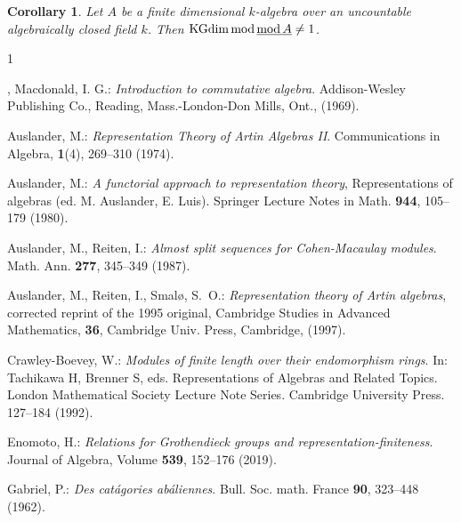 \documentclass[11pt]{amsart}
\newtheorem{corollary}[theorem]{Corollary}
\theoremstyle{definition}
\numberwithin{equation}{section}
\begin{document}
\begin{corollary}\label{C11}
Let $A$ be a finite dimensional $k$-algebra over an uncountable algebraically closed field $k$. 
Then $\mathrm{KGdim}\, \mathrm{mod}\, \underline{\mathrm{mod}\, A} \neq 1$. 
\end{corollary}



\ifx\undefined\bysame 
\newcommand{\bysame}{\leavevmode\hbox to3em{\hrulefill}\,} 
\fi 
\begin{thebibliography}{1} 

, {\sc Macdonald, I. G.}: 
{\it Introduction to commutative algebra}. 
Addison-Wesley Publishing Co., Reading, Mass.-London-Don Mills, Ont., (1969). 

{\sc Auslander, M.}: 
{\it Representation Theory of Artin Algebras II}. 
Communications in Algebra, {\bf 1}(4), 269--310 (1974). 

{\sc Auslander, M.}:
{\it A functorial approach to representation theory}, 
Representations of algebras (ed. M. Auslander, E. Luis). 
Springer Lecture Notes in Math. {\bf 944}, 105--179 (1980). 

{\sc Auslander, M.}, {\sc Reiten, I.}: 
{\it Almost split sequences for Cohen-Macaulay modules}. 
Math. Ann. {\bf 277}, 345--349 (1987). 

{\sc Auslander, M.}, {\sc Reiten, I.},  {\sc Smal\o, S.~O.}: 
{\it Representation theory of Artin algebras}, corrected reprint of the 1995 original, 
Cambridge Studies in Advanced Mathematics, {\bf 36}, Cambridge Univ. Press, Cambridge, (1997). 


{\sc Crawley-Boevey, W.}:
{\it Modules of finite length over their endomorphism rings}. 
In: Tachikawa H, Brenner S, eds. Representations of Algebras and Related Topics. London Mathematical Society Lecture Note Series. Cambridge University Press. 127--184 (1992).

{\sc Enomoto, H.}: 
{\it Relations for Grothendieck groups and representation-finiteness}. 
Journal of Algebra, Volume {\bf 539}, 152--176 (2019). 

{\sc Gabriel, P.}: 
{\it Des cat\'{a}gories ab\'{a}liennes}. 
Bull. Soc. math. France {\bf 90}, 323--448 (1962). 


\end{thebibliography}
\end{document}
